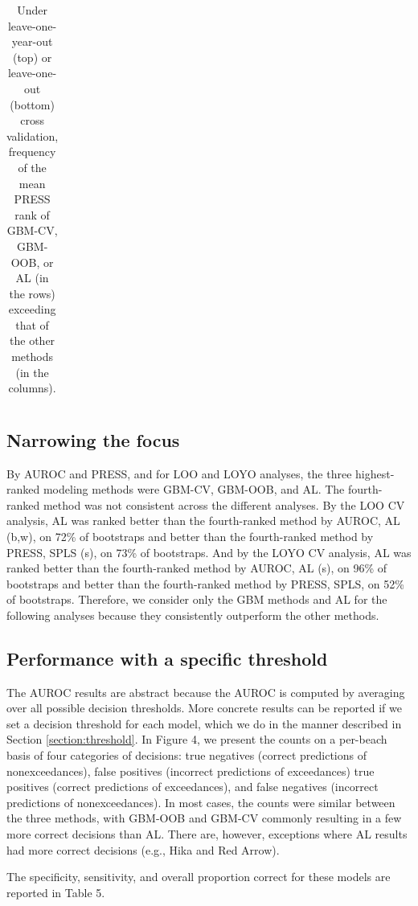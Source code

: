 \documentclass[authoryear,review, 12pt]{elsarticle}
\begin{document}
\begin{table}
\begin{tabular}{rccccccc}
    \end{tabular}
    \caption{Under leave-one-year-out (top) or leave-one-out (bottom) cross validation, frequency of the mean PRESS rank of GBM-CV, GBM-OOB, or AL (in the rows) exceeding that of the other methods (in the columns).}
    \label{table:press.pairs.annual}
\end{table}

\subsection{Narrowing the focus}\label{narrowing-the-focus}

By AUROC and PRESS, and for LOO and LOYO analyses, the three
highest-ranked modeling methods were GBM-CV, GBM-OOB, and AL. The
fourth-ranked method was not consistent across the different analyses.
By the LOO CV analysis, AL was ranked better than the fourth-ranked
method by AUROC, AL (b,w), on 72\% of bootstraps and better than the
fourth-ranked method by PRESS, SPLS (s), on 73\% of bootstraps. And by
the LOYO CV analysis, AL was ranked better than the fourth-ranked method
by AUROC, AL (s), on 96\% of bootstraps and better than the
fourth-ranked method by PRESS, SPLS, on 52\% of bootstraps. Therefore,
we consider only the GBM methods and AL for the following analyses
because they consistently outperform the other methods.

\subsection{Performance with a specific threshold}
The AUROC results are abstract because the AUROC is computed by averaging over all possible decision thresholds. More concrete results can be reported if we set a decision threshold for each model, which we do in the manner described in Section \ref{section:threshold}. In Figure 4, we present the counts on a per-beach basis of four
categories of decisions: true negatives (correct predictions of
nonexceedances), false positives (incorrect predictions of exceedances)
true positives (correct predictions of exceedances), and false negatives
(incorrect predictions of nonexceedances). In most cases, the counts
were similar between the three methods, with GBM-OOB and GBM-CV
commonly resulting in a few more correct decisions than AL. There are,
however, exceptions where AL results had more correct decisions (e.g.,
Hika and Red Arrow).

The specificity, sensitivity, and overall proportion correct for these models are reported in Table 5. 
\end{document}

